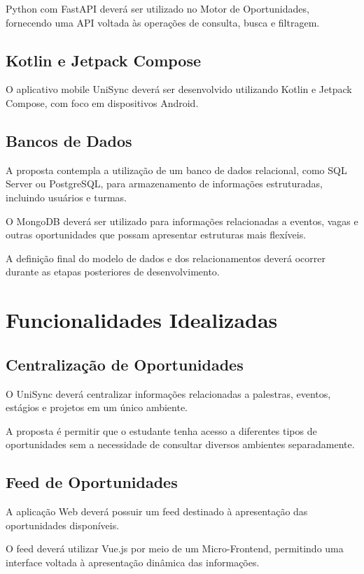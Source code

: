 \documentclass[12pt,oneside,a4paper,chapter=TITLE]{abntex2}
\begin{document}
Python com FastAPI deverá ser utilizado no Motor de Oportunidades,
fornecendo uma API voltada às operações de consulta, busca e filtragem.

\section{Kotlin e Jetpack Compose}

O aplicativo mobile UniSync deverá ser desenvolvido utilizando Kotlin
e Jetpack Compose, com foco em dispositivos Android.

\section{Bancos de Dados}

A proposta contempla a utilização de um banco de dados relacional,
como SQL Server ou PostgreSQL, para armazenamento de informações
estruturadas, incluindo usuários e turmas.

O MongoDB deverá ser utilizado para informações relacionadas a eventos,
vagas e outras oportunidades que possam apresentar estruturas mais
flexíveis.

A definição final do modelo de dados e dos relacionamentos deverá
ocorrer durante as etapas posteriores de desenvolvimento.

\chapter{Funcionalidades Idealizadas}

\section{Centralização de Oportunidades}

O UniSync deverá centralizar informações relacionadas a palestras,
eventos, estágios e projetos em um único ambiente.

A proposta é permitir que o estudante tenha acesso a diferentes tipos
de oportunidades sem a necessidade de consultar diversos ambientes
separadamente.

\section{Feed de Oportunidades}

A aplicação Web deverá possuir um feed destinado à apresentação das
oportunidades disponíveis.

O feed deverá utilizar Vue.js por meio de um Micro-Frontend, permitindo
uma interface voltada à apresentação dinâmica das informações.
\end{document}
